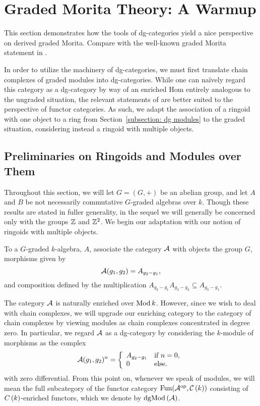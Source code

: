 \chapter{Graded Morita Theory: A Warmup} \label{subsection: graded Morita}

This section demonstrates how the tools of dg-categories yield a nice perspective on derived graded Morita. Compare with the well-known graded Morita statement in \cite{Zhang96}. 

In order to utilize the machinery of dg-categories, we must first translate chain complexes of graded modules into dg-categories.
While one can na\"ively regard this category as a dg-category by way of an enriched Hom entirely analogous to the ungraded situation, the relevant statements of \cite{Toen07} are better suited to the perspective of functor categories.
As such, we adapt the association of a ringoid with one object to a ring from Section~\ref{subsection: dg modules} to the graded situation, considering instead a ringoid with multiple objects.

\section{Preliminaries on Ringoids and Modules over Them}
Throughout this section, we will let \(G = (G, +)\) be an abelian group, and let \(A\) and \(B\) be not necessarily commutative \(G\)-graded algebras over \(k\).
Though these results are stated in fuller generality, in the sequel we will generally be concerned only with the groups \(\mathbb{Z}\) and \(\mathbb{Z}^2\).
We begin our adaptation with our notion of ringoids with multiple objects.

\begin{definition}
  To a \(G\)-graded \(k\)-algebra, \(A\), associate the category \(\mathcal{A}\) with objects the group \(G\), morphisms given by
  \[\mathcal{A}(g_1, g_2) = A_{g_2 - g_1},\]
  and composition defined by the multiplication \(A_{g_2 - g_1}A_{g_3 - g_2} \subseteq A_{g_3 - g_1}\).
\end{definition}

The category $\mathcal{A}$ is naturally enriched over $\operatorname{Mod}k$.
However, since we wish to deal with chain complexes, we will upgrade our enriching category to the category of chain complexes by viewing modules as chain complexes concentrated in degree zero.
In particular, we regard \(\mathcal{A}\) as a dg-category by considering the \(k\)-module of morphisms as the complex
$$\mathcal{A}(g_1,g_2)^n = \left\{
\begin{array}{ll}
  A_{g_2 - g_1} & \text{if}\ n = 0,\\
  0 & \text{else}.
\end{array}
\right.$$
with zero differential.
From this point on, whenever we speak of modules, we will mean the full subcategory of the functor category $\operatorname{Fun}(\mathcal{A}^{\operatorname{op}},\mathcal{C}\left(k\right))$ consisting of $C\left(k\right)$-enriched functors, which we denote by $\operatorname{dgMod}\left(\mathcal{A}\right)$.

